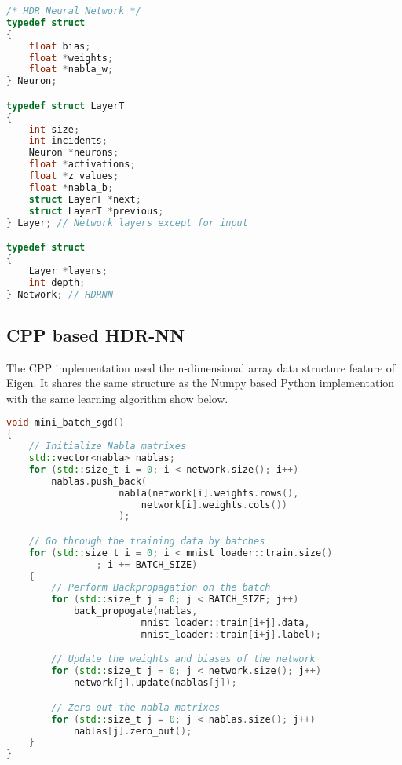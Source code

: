 \begin{lstlisting}[language=C]
/* HDR Neural Network */
typedef struct
{
	float bias;
	float *weights;
	float *nabla_w;
} Neuron;

typedef struct LayerT
{
	int size;
	int incidents;
	Neuron *neurons;
	float *activations;
	float *z_values;
	float *nabla_b;
	struct LayerT *next;
	struct LayerT *previous;
} Layer; // Network layers except for input

typedef struct
{
	Layer *layers;
	int depth;
} Network; // HDRNN
\end{lstlisting}

\subsection{CPP based HDR-NN}

The CPP implementation used the n-dimensional array data structure feature of Eigen. It shares the same structure as the Numpy based Python implementation with the same learning algorithm show below.

\begin{lstlisting}[language=C++]
void mini_batch_sgd()
{
	// Initialize Nabla matrixes
	std::vector<nabla> nablas;
	for (std::size_t i = 0; i < network.size(); i++)
		nablas.push_back(
					nabla(network[i].weights.rows(),
						network[i].weights.cols())
					);

	// Go through the training data by batches
	for (std::size_t i = 0; i < mnist_loader::train.size()
				; i += BATCH_SIZE)
	{
		// Perform Backpropagation on the batch
		for (std::size_t j = 0; j < BATCH_SIZE; j++)
			back_propogate(nablas,
						mnist_loader::train[i+j].data,
						mnist_loader::train[i+j].label);

		// Update the weights and biases of the network
		for (std::size_t j = 0; j < network.size(); j++)
			network[j].update(nablas[j]);

		// Zero out the nabla matrixes
		for (std::size_t j = 0; j < nablas.size(); j++)
			nablas[j].zero_out();
	}
}
\end{lstlisting}